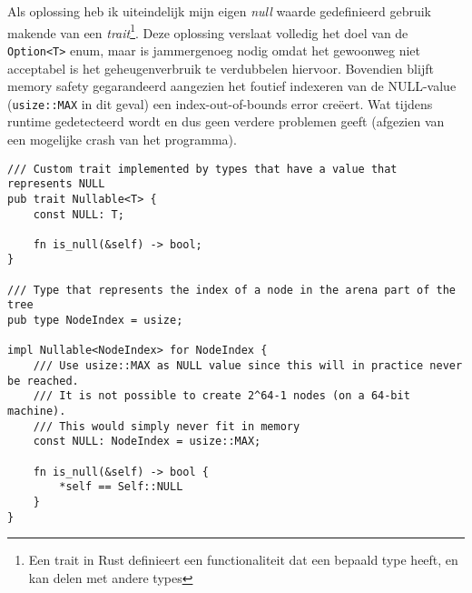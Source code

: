 Als oplossing heb ik uiteindelijk mijn eigen \textit{null} waarde gedefinieerd gebruik makende van een \textit{trait}\footnote{Een trait in Rust definieert een functionaliteit dat een bepaald type heeft, en kan delen met andere types}.
Deze oplossing verslaat volledig het doel van de \texttt{Option<T>} enum, maar is jammergenoeg nodig omdat het gewoonweg niet acceptabel is het geheugenverbruik te verdubbelen hiervoor.
Bovendien blijft memory safety gegarandeerd aangezien het foutief indexeren van de NULL-value (\texttt{usize::MAX} in dit geval) een index-out-of-bounds error creëert.
Wat tijdens runtime gedetecteerd wordt en dus geen verdere problemen geeft (afgezien van een mogelijke crash van het programma).

\begin{verbatim}
/// Custom trait implemented by types that have a value that represents NULL
pub trait Nullable<T> {
    const NULL: T;

    fn is_null(&self) -> bool;
}

/// Type that represents the index of a node in the arena part of the tree
pub type NodeIndex = usize;

impl Nullable<NodeIndex> for NodeIndex {
    /// Use usize::MAX as NULL value since this will in practice never be reached.
    /// It is not possible to create 2^64-1 nodes (on a 64-bit machine).
    /// This would simply never fit in memory
    const NULL: NodeIndex = usize::MAX;

    fn is_null(&self) -> bool {
        *self == Self::NULL
    }
}
\end{verbatim}

